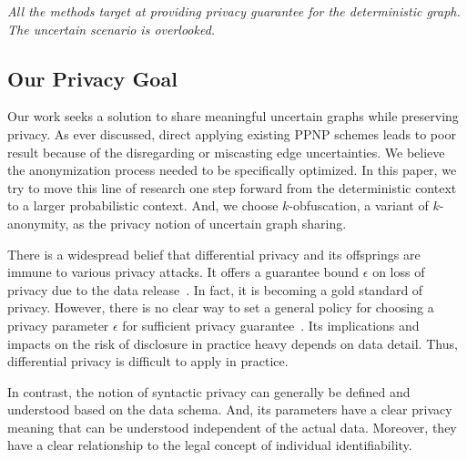 \emph{All the methods target at providing privacy guarantee for the deterministic graph. The uncertain scenario is overlooked.}

\vspace{-5pt}
\subsection{Our Privacy Goal}
\vspace{-2.5pt}

Our work seeks a solution to share meaningful uncertain graphs while preserving privacy.
As ever discussed, direct applying existing PPNP schemes leads to poor result because of the disregarding or miscasting edge uncertainties. We believe the anonymization process needed to be specifically optimized. In this paper, we try to move this line of research one step forward from the deterministic context to a larger probabilistic context.  And, we choose $k$-obfuscation, a variant of $k$-anonymity, as the privacy notion of uncertain graph sharing. 

There is a widespread belief that differential privacy and its offsprings are immune to various privacy attacks. It offers a guarantee bound $\epsilon$ on loss of privacy due to the data release~\cite{Sala_Sharing_2011,Xiao_Differentially_2014}. In fact, it is becoming a gold standard of privacy. However, there is no clear way to set a general policy for choosing a privacy parameter $\epsilon$ for sufficient privacy guarantee~\cite{lee2011}. Its implications and impacts on the risk of disclosure in practice heavy depends on data detail. Thus, differential privacy is difficult to apply in practice. 

In contrast, the notion of syntactic privacy can generally be defined and understood based on the data schema. And, its parameters have a clear privacy meaning that can be understood independent of the actual data. Moreover, they have a clear relationship to the legal concept of individual identifiability. 
